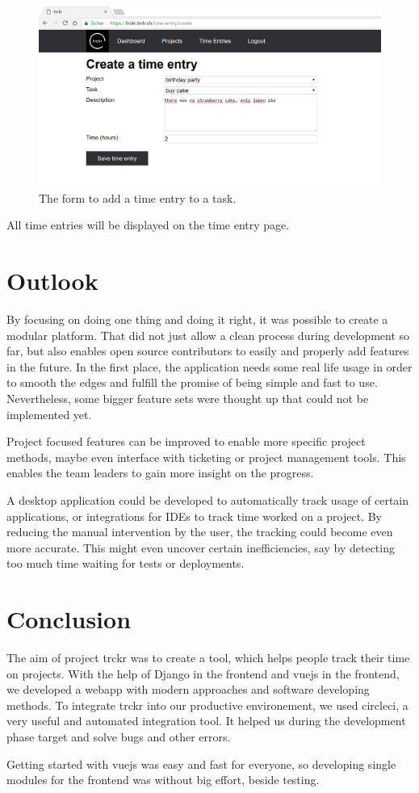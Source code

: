\documentclass[bibliography=totoc, listof=totocnumbered]{scrartcl}
\begin{document}
\begin{figure}[h]
    \includegraphics[width=\textwidth]{trckr-create-time-entry}
    \caption{The form to add a time entry to a task.}
    \label{fig:trckr-create-time-entry}
\end{figure}

All time entries will be displayed on the time entry page.

\section{Outlook}
By focusing on doing one thing and doing it right, it was possible to create a
modular platform. That did not just allow a clean process during development so
far, but also enables open source contributors to easily and properly add
features in the future. In the first place, the application needs some real life
usage in order to smooth the edges and fulfill the promise of being simple and
fast to use. Nevertheless, some bigger feature sets were thought up that could
not be implemented yet.

Project focused features can be improved to enable more specific project
methods, maybe even interface with ticketing or project management tools. This
enables the team leaders to gain more insight on the progress.

A desktop application could be developed to automatically track usage of certain
applications, or integrations for IDEs to track time worked on a project. By
reducing the manual intervention by the user, the tracking could become even
more accurate. This might even uncover certain inefficiencies, say by detecting
too much time waiting for tests or deployments.

\section{Conclusion}
The aim of project trckr was to create a tool, which helps people track their
time on projects. With the help of Django in the frontend and vuejs in the
frontend, we developed a webapp with modern approaches and software developing
methods. To integrate trckr into our productive environement, we used circleci,
a very useful and automated integration tool. It helped us during the development
phase target and solve bugs and other errors.

Getting started with vuejs was easy and fast for everyone, so developing single
modules for the frontend was without big effort, beside testing.

\clearpage
\printbibliography
\end{document}
